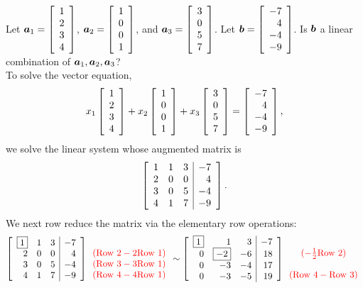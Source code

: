 \begin{Exam} Let $\bb a_1 = \vr{1\\2\\3\\4}$, $\bb a_2 = \vr{1\\0\\0\\1}$, and $\bb a_3 = \vr{3\\0\\5\\7}$. Let $\bb b = \vr{-7 \\ 4 \\ -4 \\ -9}$. Is $\bb b$ a linear combination of $\bb a_1, \bb a_2, \bb a_3$?\\

To solve the vector equation, 
\[x_1\vr{1\\2\\3\\4} + x_2 \vr{1\\0\\0\\1} + x_3\vr{3\\0\\5\\7} = \vr{-7 \\ 4 \\ -4 \\ -9},\] we solve the linear system whose augmented matrix is 
\[\mtx{rrr|r}{1&1&3&-7\\2&0&0&4\\3&0&5&-4\\4&1&7&-9}.\] We next row reduce the matrix via the elementary row operations:
\[\mtx{rrr|r}{\fbox{1}&1&3&-7\\2&0&0&4\\3&0&5&-4\\4&1&7&-9}{\color{red}\begin{array}{c} \mbox{}\\ (\text{Row 2} - 2\text{Row 1}) \\ (\text{Row 3} - 3\text{Row 1}) \\ (\text{Row 4} - 4\text{Row 1})\end{array}} 
\sim  \mtx{rrr|r}{\fbox{1}&1&3&-7\\0&\fbox{$-2$}&-6&18\\0&-3&-4&17\\0&-3&-5&19}{\color{red}\begin{array}{c} \mbox{}\\ (-\frac{1}{2}\text{Row 2}) \\ \mbox{} \\ (\text{Row 4} - \text{Row 3})\end{array}}\]

\end{Exam}
